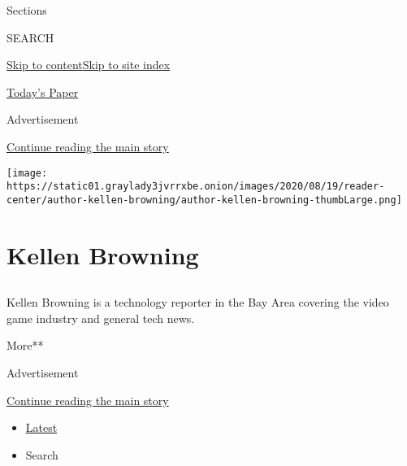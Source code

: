 Sections

SEARCH

\protect\hyperlink{site-content}{Skip to
content}\protect\hyperlink{site-index}{Skip to site index}

\href{https://myaccount.nytimes3xbfgragh.onion/auth/login?response_type=cookie\&client_id=vi}{}

\href{https://www.nytimes3xbfgragh.onion/section/todayspaper}{Today's
Paper}

Advertisement

\protect\hyperlink{after-top}{Continue reading the main story}

\texttt{[image: https://static01.graylady3jvrrxbe.onion/images/2020/08/19/reader-center/author-kellen-browning/author-kellen-browning-thumbLarge.png]}

\hypertarget{kellen-browning}{%
\section{Kellen Browning}\label{kellen-browning}}

\subsection{}

Kellen Browning is a technology reporter in the Bay Area covering the
video game industry and general tech news.

More**

Advertisement

\protect\hyperlink{after-mid1}{Continue reading the main story}

\begin{itemize}
\tightlist
\item
  \protect\hyperlink{stream-panel}{Latest}
\item
  Search
\end{itemize}

